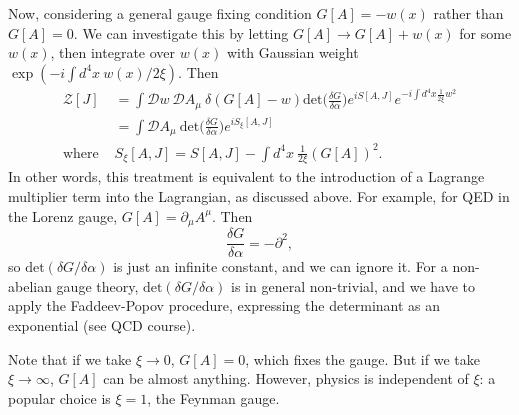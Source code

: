 Now, considering a general gauge fixing condition $G[A] = -w(x)$ rather than $G[A] = 0$. We can investigate this by letting $G[A] \to G[A] + w(x)$ for some $w(x)$, then integrate over $w(x)$ with Gaussian weight $\exp(-i\int d^4x \ w(x)/2\xi)$. Then
\begin{equation}
\begin{split}
\mathcal{Z}[J] &= \int \mathcal{D} w\ \mathcal{D} A_\mu \ \delta(G[A] - w) \text{det} \bigg(\frac{\delta G}{\delta \alpha}\bigg) e^{i S [A,J]} e^{-i \int d^4x \frac{1}{2\xi}w^2} \\
&= \int \mathcal{D} A_\mu\ \text{det}\bigg(\frac{\delta G}{\delta \alpha}\bigg) e^{iS_\xi [A,J]} \\
\text{where } &S_\xi[A,J] = S[A,J] - \int d^4x\ \frac{1}{2\xi} (G[A])^2.
\end{split}
\end{equation}
In other words, this treatment is equivalent to the introduction of a Lagrange multiplier term into the Lagrangian, as discussed above.
For example, for QED in the Lorenz gauge, $G[A] = \partial_\mu A^\mu$. Then 
\begin{equation}
\frac{\delta G}{\delta \alpha} = -\partial^2,
\end{equation}
so $\text{det}(\delta G/\delta \alpha)$ is just an infinite constant, and we can ignore it. For a non-abelian gauge theory, $\text{det}(\delta G/\delta \alpha)$ is in general non-trivial, and we have to apply the Faddeev-Popov procedure, expressing the determinant as an exponential (see QCD course).

Note that if we take $\xi \to 0$, $G[A]=0$, which fixes the gauge. But if we take $\xi \to \infty$, $G[A]$ can be almost anything. However, physics is independent of $\xi$: a popular choice is $\xi =1$, the Feynman gauge.

